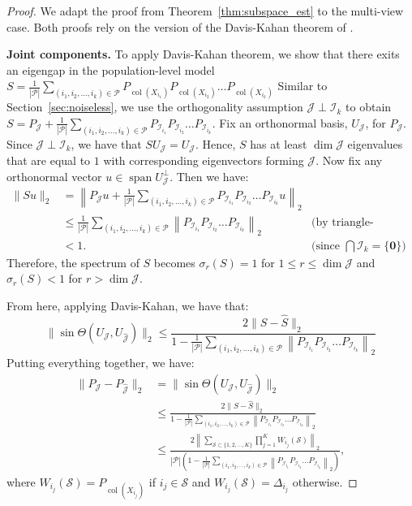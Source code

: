\documentclass{amsart}
\DeclareMathOperator*{\col}{col}
\DeclareMathOperator*{\spann}{span}
\newcommand{\Scal}{\mathcal{S}}
\newcommand{\Pcal}{\mathcal{P}}
\newcommand{\Jcal}{\mathcal{J}}
\newcommand{\Ical}{\mathcal{I}}
\begin{document}
\begin{proof} We adapt the proof from Theorem~\ref{thm:subspace_est} to the multi-view case. Both proofs rely on the version of the Davis-Kahan theorem of \citet{yu2015useful}.

    \noindent
    \textbf{Joint components.}
    To apply Davis-Kahan theorem, we show that there exits an eigengap in the population-level model $S = \frac{1}{|\Pcal|}\sum_{(i_1, i_2, \dots, i_k) \in \Pcal} P_{\col({X}_{i_1})}P_{\col({X}_{i_2})}\dots P_{\col({X}_{i_k})}$
    Similar to Section~\ref{sec:noiseless}, we use the orthogonality assumption $\Jcal \perp \Ical_k$ to obtain $S = P_{\Jcal} + \frac{1}{|\Pcal|}\sum_{(i_1, i_2, \dots, i_k)\in \Pcal} P_{\Ical_{i_1}}P_{\Ical_{i_2}}\dots P_{\Ical_{i_k}}$. Fix an orthonormal basis, $U_{\Jcal}$, for $P_{\Jcal}$. Since $\Jcal \perp \Ical_k$, we have that $SU_{\Jcal} = U_{\Jcal}$. Hence, $S$ has at least $\dim \Jcal$ eigenvalues that are equal to $1$ with corresponding eigenvectors forming $\Jcal$. Now fix any orthonormal vector $u \in \spann U_{\Jcal}^\perp$. Then we have:
    \begin{align*}
        \|Su\|_2 &= \left\|P_{\Jcal} u + \frac{1}{|\Pcal|}\sum_{(i_1, i_2, \dots, i_k)\in \Pcal} P_{\Ical_{i_1}}P_{\Ical_{i_2}}\dots P_{\Ical_{i_k}} u\right\|_2 \\
        &\leq \frac{1}{|\Pcal|} \sum_{(i_1, i_2, \dots, i_k)\in \Pcal} \left\| P_{\Ical_{i_1}}P_{\Ical_{i_2}}\dots P_{\Ical_{i_k}}\right\|_2 & \text{(by triangle-inequality)} \\
        &< 1. & \text{(since } \bigcap \Ical_k = \{\mathbf{0}\})
    \end{align*}
    Therefore, the spectrum of $S$ becomes $\sigma_r(S) = 1$ for $1 \leq r \leq \dim\Jcal$ and $\sigma_r (S) < 1$ for $r > \dim \Jcal$. 

    From here, applying Davis-Kahan, we have that:
    \begin{equation*}
        \| \sin\Theta(U_{\Jcal}, U_{\widehat{\Jcal}}) \|_2 \leq \frac{{2}  \| S - \widehat{S}\|_2}{1-\frac{1}{|\Pcal|} \sum_{(i_1, i_2, \dots, i_k)\in \Pcal} \left\| P_{\Ical_{i_1}}P_{\Ical_{i_2}}\dots P_{\Ical_{i_k}}\right\|_2}
    \end{equation*}
    Putting everything together, we have:
    \begin{align*}
        \| P_{\Jcal} - P_{\widehat{\Jcal}} \|_2 &=  \| \sin\Theta(U_{\Jcal}, U_{\widehat{\Jcal}} ) \|_2 \\
        &\leq \frac{{2}\|  S- \widehat{S}\|_2}{1-\frac{1}{|\Pcal|} \sum_{(i_1, i_2, \dots, i_k)\in \Pcal} \left\| P_{\Ical_{i_1}}P_{\Ical_{i_2}}\dots P_{\Ical_{i_k}}\right\|_2} \\
        &\leq  \frac{{2}\left\| \sum_{\Scal \subset \{1, 2, \dots, K\}} \prod_{j=1}^K W_{i_j}(\Scal) \right\|_2}{|\Pcal| \left(1-\frac{1}{|\Pcal|} \sum_{(i_1, i_2, \dots, i_k)\in \Pcal} \left\| P_{\Ical_{i_1}}P_{\Ical_{i_2}}\dots P_{\Ical_{i_k}}\right\|_2\right)},
        \end{align*} 
        where $W_{i_j}(\Scal) = P_{\col(X_{i_j})}$ if $i_j \in \Scal$ and $W_{i_j}(\Scal) = \Delta_{i_j}$ otherwise. 


\end{proof}
\end{document}

